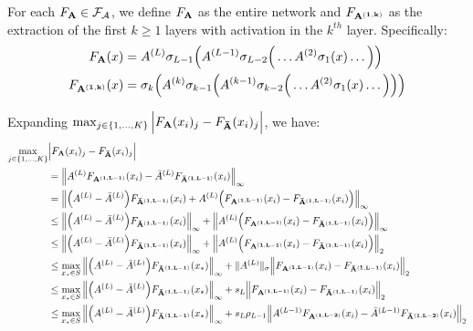 \noindent For each $F_{\bf A}\in\mathcal{F}_\mathcal{A}$, we define $F_{\bf A}$ as the entire network and $F_{\bf A^{(1, k)}}$ as the extraction of the first $k\ge 1$ layers with activation in the $k^{th}$ layer. Specifically:
\begin{align*}
    F_{\bf A}(x) &= A^{(L)}\sigma_{L-1}\Big( A^{(L-1)}\sigma_{L-2}\Big(  \dots A^{(2)}\sigma_1(x) \dots \Big) \Big) \\   
    F_{\bf A^{(1, k)}}(x) &= \sigma_k\Big( 
        A^{(k)}\sigma_{k-1}\Big( A^{(k-1)}\sigma_{k-2}\Big( \dots A^{(2)}\sigma_1(x) \dots \Big) \Big)
     \Big)
\end{align*}

\noindent Expanding $\max_{j\in\{1, \dots, K\}}\Big| F_{\bf A}(x_i)_j - F_{\bf \bar A}(x_i)_j \Big|$, we have:
\begin{align*}
    \max_{j\in\{1, \dots, K\}}&\Big|  F_{\bf A}(x_i)_j - F_{\bf \bar A}(x_i)_j  \Big| \\
        &=  \Big\|
            A^{(L)}F_{\bf A^{(1, L-1)}}(x_i) - {\bar A}^{(L)}F_{\bf {\bar A}^{(1, L-1)}}(x_i)
        \Big\|_\infty \\
        &= \Big\|
            \Big( A^{(L)}-{\bar A}^{(L)} \Big)F_{\bf {\bar A}^{(1, L-1)}}(x_i) + A^{(L)}\Big( F_{\bf A^{(1, L-1)}}(x_i) - F_{\bf {\bar A}^{(1, L-1)}}(x_i) \Big)
        \Big\|_\infty \\
        &\le \Big\|
            \Big( A^{(L)}-{\bar A}^{(L)} \Big)F_{\bf {\bar A}^{(1, L-1)}}(x_i) 
        \Big\|_\infty
        + 
        \Big\|
            A^{(L)}\Big( F_{\bf A^{(1, L-1)}}(x_i) - F_{\bf {\bar A}^{(1, L-1)}}(x_i) \Big)
        \Big\|_\infty \\
        &\le \Big\|
            \Big( A^{(L)}-{\bar A}^{(L)} \Big)F_{\bf {\bar A}^{(1, L-1)}}(x_i) 
        \Big\|_\infty
        + 
        \Big\|
            A^{(L)}\Big( F_{\bf A^{(1, L-1)}}(x_i) - F_{\bf {\bar A}^{(1, L-1)}}(x_i) \Big)
        \Big\|_2 \\
        &\le \max_{x_*\in S}\Big\|
            \Big( A^{(L)}-{\bar A}^{(L)} \Big)F_{\bf {\bar A}^{(1, L-1)}}(x_*)
        \Big\|_\infty + \|A^{(L)}\|_\sigma\Big\|
            F_{\bf A^{(1, L-1)}}(x_i) - F_{\bf {\bar A}^{(1, L-1)}}(x_i)
        \Big\|_2 \\
        &\le \max_{x_*\in S}\Big\|
            \Big( A^{(L)}-{\bar A}^{(L)} \Big)F_{\bf {\bar A}^{(1, L-1)}}(x_*)
        \Big\|_\infty + s_L \Big\|
            F_{\bf A^{(1, L-1)}}(x_i) - F_{\bf {\bar A}^{(1, L-1)}}(x_i)
        \Big\|_2 \\
        &\le \max_{x_*\in S}\Big\|
            \Big( A^{(L)}-{\bar A}^{(L)} \Big)F_{\bf {\bar A}^{(1, L-1)}}(x_*)
        \Big\|_\infty + s_L\rho_{L-1} \Big\|
            A^{(L-1)}F_{\bf A^{(1, L-2)}}(x_i) - {\bar A}^{(L-1)}F_{\bf {\bar A}^{(1, L-2)}}(x_i) 
        \Big\|_2 \\
\end{align*}

